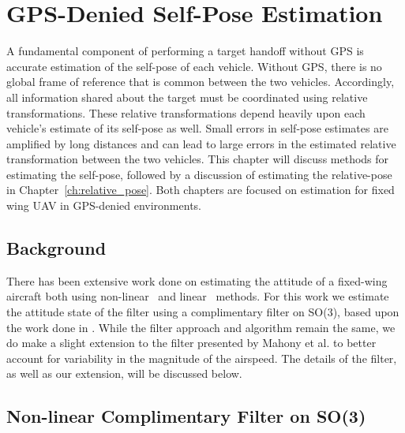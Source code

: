 \chapter{GPS-Denied Self-Pose Estimation}
\label{ch:self_pose}

A fundamental component of performing a target handoff without GPS is accurate estimation of the self-pose of each vehicle.
Without GPS, there is no global frame of reference that is common between the two vehicles. 
Accordingly, all information shared about the target must be coordinated using relative transformations. 
These relative transformations depend heavily upon each vehicle's estimate of its self-pose as well. 
Small errors in self-pose estimates are amplified by long distances and can lead to large errors in the estimated relative transformation between the two vehicles. 
This chapter will discuss methods for estimating the self-pose, followed by a discussion of estimating the relative-pose in Chapter~\ref{ch:relative_pose}. 
Both chapters are focused on estimation for fixed wing UAV in GPS-denied environments.

\section{Background}
There has been extensive work done on estimating the attitude of a fixed-wing aircraft both using non-linear~\cite{Mahony11} and linear~\cite{LiuZhouFu08} methods.
For this work we estimate the attitude state of the filter using a complimentary filter on SO(3), based upon the work done in \cite{Mahony11}. 
While the filter approach and algorithm remain the same, we do make a slight extension to the filter presented by Mahony et al. to better account for variability in the magnitude of the airspeed. The details of the filter, as well as our extension, will be discussed below.


% 

\section{Non-linear Complimentary Filter on SO(3)}


